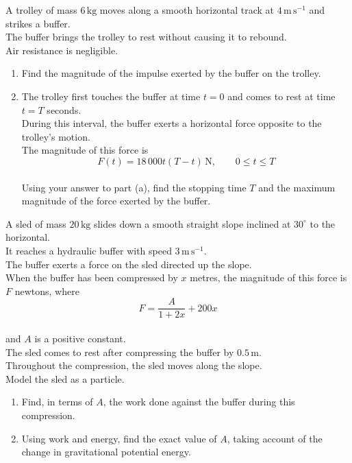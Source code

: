 \documentclass[leqno]{article}
\begin{document}
\begin{enumerate}[
  label=\textbf{\arabic*.},
  leftmargin=*,
  topsep=0pt,
  partopsep=0pt,
  parsep=0pt
]
A trolley of mass $6\,\mathrm{kg}$ moves along a smooth horizontal track at $4\,\mathrm{m\,s^{-1}}$ and strikes a buffer. \\
The buffer brings the trolley to rest without causing it to rebound. \\
Air resistance is negligible. \\
\begin{enumerate}[label=\textbf{(\alph*)}]
\item Find the magnitude of the impulse exerted by the buffer on the trolley.  \\
\item The trolley first touches the buffer at time $t=0$ and comes to rest at time $t=T$ seconds. \\
During this interval, the buffer exerts a horizontal force opposite to the trolley's motion. \\
The magnitude of this force is
\[
F(t)=18\,000t(T-t)\,\mathrm{N},\qquad 0\leq t\leq T
\] \\
Using your answer to part (a), find the stopping time $T$ and the maximum magnitude of the force exerted by the buffer.  \\
\end{enumerate}

\newpage

\questionitem

A sled of mass $20\,\mathrm{kg}$ slides down a smooth straight slope inclined at $30^\circ$ to the horizontal. \\
It reaches a hydraulic buffer with speed $3\,\mathrm{m\,s^{-1}}$. \\

The buffer exerts a force on the sled directed up the slope. \\
When the buffer has been compressed by $x$ metres, the magnitude of this force is $F$ newtons, where
\[
F=\frac{A}{1+2x}+200x
\] \\
and $A$ is a positive constant. \\
The sled comes to rest after compressing the buffer by $0.5\,\mathrm{m}$. \\
Throughout the compression, the sled moves along the slope. \\
Model the sled as a particle. \\

\begin{enumerate}[label=\textbf{(\alph*)}]
  \item Find, in terms of $A$, the work done against the buffer during this compression.  \\
  \item Using work and energy, find the exact value of $A$, taking account of the change in gravitational potential energy.  \\
\end{enumerate}


\end{enumerate}
\end{document}

